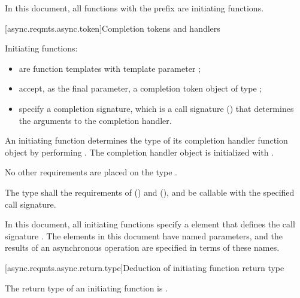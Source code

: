 \pnum
In this document, all functions with the prefix  are initiating functions.



[async.reqmts.async.token]{Completion tokens and handlers}

%
\pnum
Initiating functions:

\begin{itemize}
\item
are function templates with template parameter ;

%
\item
accept, as the final parameter, a completion token object  of type ;

%
\item
specify a completion signature, which is a call signature ()  that determines the arguments to the completion handler.
\end{itemize}

%
\pnum
An initiating function determines the type  of its
completion handler function object by performing
.
The completion handler object  is initialized with
.
\begin{note} No other requirements are placed on the type . \end{note}

\pnum
The type  shall  the requirements of  () and  (), and be callable with the specified call signature.

\pnum
In this document, all initiating functions specify a
\completionsig element that defines the call signature .
The \completionsig elements in this document have named
parameters, and the results of an asynchronous operation are specified in
terms of these names.



[async.reqmts.async.return.type]{Deduction of initiating function return type}

%
\pnum
The return type of an initiating function is .

